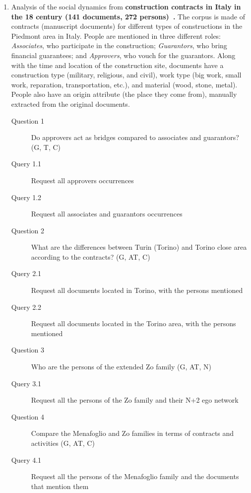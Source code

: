 \begin{enumerate}
    \item Analysis of the social dynamics from \textbf{construction contracts in Italy in the 18 century (141 documents, 272 persons)~\cite{Cristofoli2018}.}
    The corpus is made of contracts (manuscript documents) for different types of constructions in the Piedmont area in Italy. People are mentioned in three different roles: \textit{Associates}, who participate in the construction; \textit{Guarantors}, who bring financial guarantees; and \textit{Approvers}, who vouch for the guarantors. Along with the time and location of the construction site, documents have a construction type (military, religious, and civil), work type (big work, small work, reparation, transportation, etc.), and material (wood, stone, metal). People also have an origin attribute (the place they come from), manually extracted from the original documents.
    \begin{footnotesize}
    \begin{description}
    \item[Question 1] Do approvers act as bridges compared to associates and guarantors? (G, T, C)
    \item[\myindent Query 1.1] Request all approvers occurrences
    \item[\myindent Query 1.2 ] Request all associates and guarantors occurrences
    \item[Question 2] What are the differences between Turin (Torino) and Torino close area according to the contracts? (G, AT, C)
    \item[\myindent Query 2.1] Request all documents located in Torino, with the persons mentioned
    \item[\myindent Query 2.2] Request all documents located in the Torino area, with the persons mentioned
    \item[Question 3] Who are the persons of the extended Zo family (G, AT, N)
    \item[\myindent Query 3.1] Request all the persons of the Zo family and their N+2 ego network
    \item[Question 4] Compare the Menafoglio and Zo families in terms of contracts and activities (G, AT, C)
    \item[\myindent Query 4.1] Request all the persons of the Menafoglio family and the documents that mention them

\end{description}
\end{footnotesize}
\end{enumerate}

